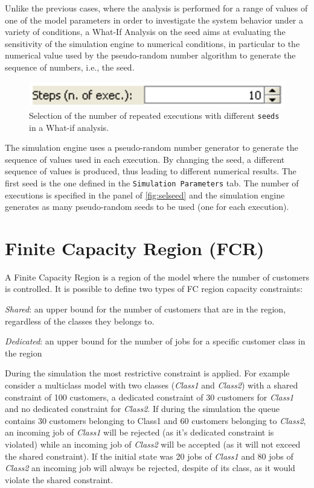 \begin{itemize*}
Unlike the previous cases, where the analysis is performed for a
range of values of one of the model parameters in order to
investigate the system behavior under a variety of conditions, a
What-If Analysis on the seed aims at evaluating the sensitivity of
the simulation engine to numerical conditions, in particular to
the numerical value used by the pseudo-random number algorithm to
generate the sequence of numbers, i.e., the seed.
\begin{figure}[hbt]
    \begin{center}
        \includegraphics[scale=.5]{img/jsimg/7.7.eps}
    \end{center}
    \caption{Selection of the number of repeated executions with
    different \texttt{seeds} in a What-if analysis.}
    \label{fig:selseed}
\end{figure}
The simulation engine uses a pseudo-random number generator to
generate the sequence of values used in each execution. By
changing the seed, a different sequence of values is produced,
thus leading to different numerical results. The first seed is the
one defined in the \texttt{Simulation Parameters} tab. The number
of executions is specified in the panel of \autoref{fig:selseed}
and the simulation engine generates as many pseudo-random seeds to
be used (one for each execution).
\end{itemize*}

\section{Finite Capacity Region (FCR)}
\label{defcap}


A Finite Capacity Region is a region of the model where the number
of customers is controlled. It is possible to define two types of
FC region capacity constraints:
\begin{itemize*}
\item \emph{Shared}: an upper bound for the number of customers
that are in the region, regardless of the classes they belongs to.
\item \emph{Dedicated}: an upper bound for the number of jobs for
a specific customer class in the region
\end{itemize*}
During the simulation the most restrictive constraint is applied.
For example consider a multiclass model with two classes
(\emph{Class1} and \emph{Class2}) with a shared constraint of 100
customers, a dedicated constraint of 30 customers for
\emph{Class1} and no dedicated constraint for \emph{Class2}. If
during the simulation the queue contains 30 customers belonging to
Class1 and 60 customers belonging to \emph{Class2}, an incoming
job of \emph{Class1} will be rejected (as it's dedicated
constraint is violated) while an incoming job of \emph{Class2}
will be accepted (as it will not exceed the shared constraint). If
the initial state was 20 jobs of \emph{Class1} and 80 jobs of
\emph{Class2} an incoming job will always be rejected, despite of
its class, as it would violate the shared constraint.\\

